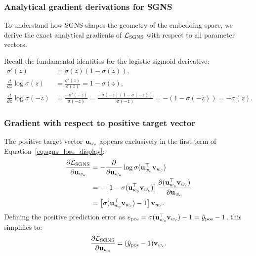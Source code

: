 \documentclass[../../main.tex]{subfiles}
\begin{document}
\subsubsection{Analytical gradient derivations for SGNS}
\label{subsec:sgns_gradients}

To understand how SGNS shapes the geometry of the embedding space, we derive the exact analytical gradients of $\mathcal{L}_{\text{SGNS}}$ with respect to all parameter vectors.

Recall the fundamental identities for the logistic sigmoid derivative:
\begin{align}
\label{eq:sigmoid_deriv_identity}
\sigma'(z) &= \sigma(z)(1 - \sigma(z)), \\
\label{eq:log_sigmoid_pos}
\frac{d}{dz} \log \sigma(z) &= \frac{\sigma'(z)}{\sigma(z)} = 1 - \sigma(z), \\
\label{eq:log_sigmoid_neg}
\frac{d}{dz} \log \sigma(-z) &= \frac{-\sigma'(-z)}{\sigma(-z)} = \frac{-\sigma(-z)(1 - \sigma(-z))}{\sigma(-z)} = -(1 - \sigma(-z)) = -\sigma(z).
\end{align}

\subsubsection{Gradient with respect to positive target vector}
The positive target vector $\mathbf{u}_{w_o}$ appears exclusively in the first term of Equation~\eqref{eq:sgns_loss_display}:
\begin{align}
\frac{\partial \mathcal{L}_{\text{SGNS}}}{\partial \mathbf{u}_{w_o}} &= -\frac{\partial}{\partial \mathbf{u}_{w_o}} \log \sigma(\mathbf{u}_{w_o}^\top \mathbf{v}_{w_c}) \notag \\
&= -\left[ 1 - \sigma(\mathbf{u}_{w_o}^\top \mathbf{v}_{w_c}) \right] \frac{\partial (\mathbf{u}_{w_o}^\top \mathbf{v}_{w_c})}{\partial \mathbf{u}_{w_o}} \notag \\
\label{eq:grad_u_pos}
&= \left[ \sigma(\mathbf{u}_{w_o}^\top \mathbf{v}_{w_c}) - 1 \right] \mathbf{v}_{w_c}.
\end{align}
Defining the positive prediction error as $e_{\text{pos}} = \sigma(\mathbf{u}_{w_o}^\top \mathbf{v}_{w_c}) - 1 = \hat{y}_{\text{pos}} - 1$, this simplifies to:
\begin{equation}
\label{eq:grad_u_pos_clean}
\frac{\partial \mathcal{L}_{\text{SGNS}}}{\partial \mathbf{u}_{w_o}} = (\hat{y}_{\text{pos}} - 1) \mathbf{v}_{w_c}.
\end{equation}
\end{document}
